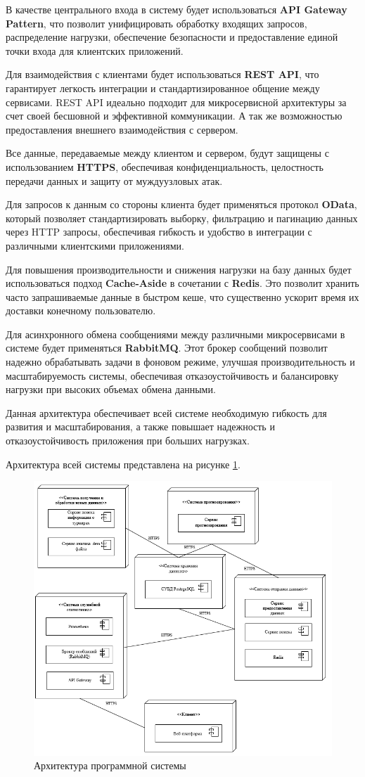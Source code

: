 В качестве центрального входа в систему будет использоваться \textbf{API Gateway Pattern}, что позволит унифицировать обработку входящих запросов, распределение нагрузки, обеспечение безопасности и предоставление единой точки входа для клиентских приложений.

Для взаимодействия с клиентами будет использоваться \textbf{REST API}, что гарантирует легкость интеграции и стандартизированное общение между сервисами. REST API идеально подходит для микросервисной архитектуры за счет своей бесшовной и эффективной коммуникации. А так же возможностью предоставления внешнего взаимодействия с сервером.

Все данные, передаваемые между клиентом и сервером, будут защищены с использованием \textbf{HTTPS}, обеспечивая конфиденциальность, целостность передачи данных и защиту от муждуузловых атак.

Для запросов к данным со стороны клиента будет применяться протокол \textbf{OData}, который позволяет стандартизировать выборку, фильтрацию и пагинацию данных через HTTP запросы, обеспечивая гибкость и удобство в интеграции с различными клиентскими приложениями.

Для повышения производительности и снижения нагрузки на базу данных будет использоваться подход \textbf{Cache-Aside} в сочетании с \textbf{Redis}. Это позволит хранить часто запрашиваемые данные в быстром кеше, что существенно ускорит время их доставки конечному пользователю.

Для асинхронного обмена сообщениями между различными микросервисами в системе будет применяться \textbf{RabbitMQ}. Этот брокер сообщений позволит надежно обрабатывать задачи в фоновом режиме, улучшая производительность и масштабируемость системы, обеспечивая отказоустойчивость и балансировку нагрузки при высоких объемах обмена данными.

Данная архитектура обеспечивает всей системе необходимую гибкость для развития и масштабирования, а также повышает надежность и отказоустойчивость приложения при больших нагрузках.

Архитектура всей системы представлена на рисунке \ref{fig:-architecture}.
\begin{figure}
	\centering
	\includegraphics[width=0.7\linewidth]{"images/Архитектура"}
	\caption{Архитектура программной системы}
	\label{fig:-architecture}
\end{figure}

